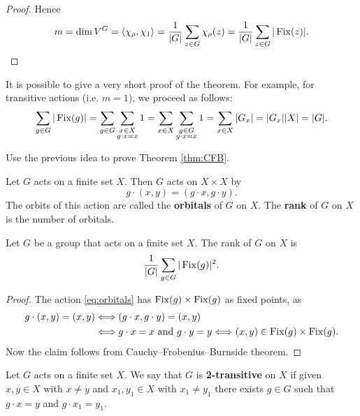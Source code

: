 \begin{proof}
    Hence 
    \[
    m=\dim V^G=\langle\chi_\rho,\chi_1\rangle=\frac{1}{|G|}\sum_{z\in G}\chi_\rho(z)
    =\frac{1}{|G|}\sum_{z\in G}|\operatorname{Fix}(z)|.\qedhere 
    \]
\end{proof}

It is possible to give a very short proof of the theorem. For example, 
for transitive actions (i.e. $m=1$), we proceed as follows:
\[
\sum_{g\in G}|\operatorname{Fix}(g)|=\sum_{g\in G}\sum_{\substack{x\in X\\g\cdot x=x}}1
=\sum_{x\in X}\sum_{\substack{g\in G\\g\cdot x=x}}1
=\sum_{x\in X}|G_x|=|G_x||X|=|G|.
\]

\begin{exercise}
\label{xca:CFB}
    Use the previous idea to prove Theorem \ref{thm:CFB}. 
\end{exercise}

Let $G$ acts on a finite set $X$. Then $G$ acts
on $X\times X$ by
\begin{equation}
    \label{eq:orbitals}
    g\cdot (x,y)=(g\cdot x,g\cdot y).
\end{equation}
The orbits of this action are called
the \textbf{orbitals} of $G$ on $X$. The \textbf{rank} 
of $G$ on $X$ is the number of orbitals. 

\begin{proposition}
    Let $G$ be a group that acts on a finite set $X$.
    The rank of $G$ on $X$ is 
    \[
    \frac{1}{|G|}\sum_{g\in G}|\operatorname{Fix}(g)|^2.
    \]
\end{proposition}

\begin{proof}
    The action \eqref{eq:orbitals} has 
    $\operatorname{Fix}(g)\times\operatorname{Fix}(g)$ as fixed points, as 
    \begin{align*}
        g\cdot (x,y)=(x,y)&\Longleftrightarrow
        (g\cdot x,g\cdot y)=(x,y)\\
        &\Longleftrightarrow g\cdot x=x\text{ and }g\cdot y=y\Longleftrightarrow
        (x,y)\in\operatorname{Fix}(g)\times\operatorname{Fix}(g).
    \end{align*}
    Now the claim follows from Cauchy--Frobenius--Burnside theorem. 
\end{proof}

\begin{definition}
    Let $G$ acts on a finite set $X$. 
    We say that $G$ is \textbf{2-transitive} on $X$ 
    if given $x,y\in X$ with $x\ne y$ and 
    $x_1,y_1\in X$ with $x_1\ne y_1$ there exists 
    $g\in G$ such that $g\cdot x=y$ and $g\cdot x_1=y_1$. 
\end{definition}


